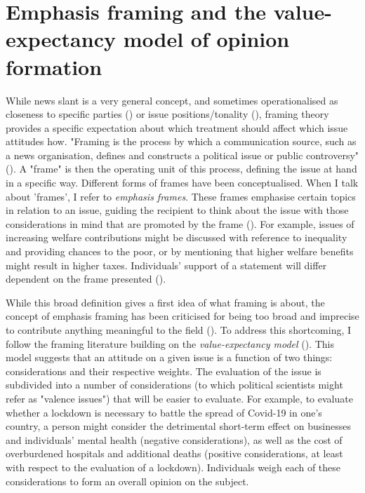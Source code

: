 \documentclass{article}
\begin{document}
\section{Emphasis framing and the value-expectancy model of opinion formation}

While news slant is a very general concept, and sometimes operationalised as closeness to specific parties (\cite{Gentzkow2010}) or issue positions/tonality (\cite{Spirig2020}), framing theory provides a specific expectation about which treatment should affect which issue attitudes how. "Framing is the process by which a communication source, such as a news organisation, defines and constructs a political issue or public controversy" (\cite[567]{Nelson1997}). A "frame" is then the operating unit of this process, defining the issue at hand in a specific way. Different forms of frames have been conceptualised. When I talk about 'frames', I refer to \textit{emphasis frames}. These frames emphasise certain topics in relation to an issue, guiding the recipient to think about the issue with those considerations in mind that are promoted by the frame (\cite[153f]{Leeper2020}). For example, issues of increasing welfare contributions might be discussed with reference to inequality and providing chances to the poor, or by mentioning that higher welfare benefits might result in higher taxes. Individuals' support of a statement will differ dependent on the frame presented (\cite{sniderman2004structure}).

While this broad definition gives a first idea of what framing is about, the concept of emphasis framing has been criticised for being too broad and imprecise to contribute anything meaningful to the field (\cite{Scheufele2012}). To address this shortcoming, I follow the framing literature building on the \textit{value-expectancy model} (\cite{Ajzen2000, Nelson1997}). This model suggests that an attitude on a given issue is a function of two things: considerations and their respective weights. The evaluation of the issue is subdivided into a number of considerations (to which political scientists might refer as "valence issues") that will be easier to evaluate. For example, to evaluate whether a lockdown is necessary to battle the spread of Covid-19 in one's country, a person might consider the detrimental short-term effect on businesses and individuals' mental health (negative considerations), as well as the cost of overburdened hospitals and additional deaths (positive considerations, at least with respect to the evaluation of a lockdown). Individuals weigh each of these considerations to form an overall opinion on the subject. 
\end{document}
